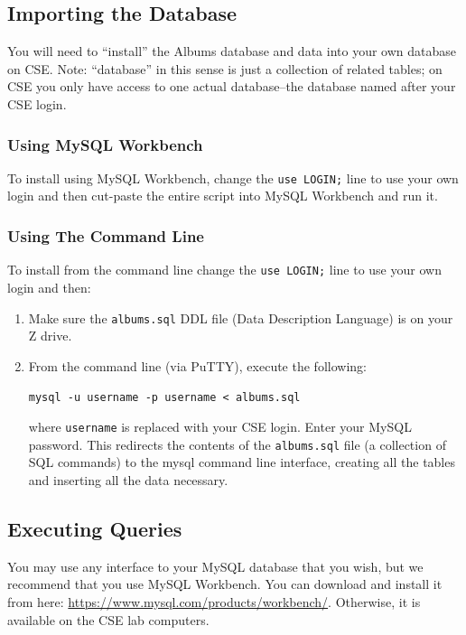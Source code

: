 \documentclass[12pt]{scrartcl}
\begin{document}
\subsection*{Importing the Database}

You will need to ``install'' the Albums database and data into your 
own database on CSE.  Note: ``database'' in this sense is just a collection 
of related tables; on CSE you only have access to one actual 
database--the database named after your CSE login.  

\subsubsection*{Using MySQL Workbench}

To install using MySQL Workbench, change the \texttt{use LOGIN;}
line to use your own login and then cut-paste the entire script into MySQL
Workbench and run it.  

\subsubsection*{Using The Command Line}

To install from the command line change the \texttt{use LOGIN;}
line to use your own login and then:

\begin{enumerate}
  \item Make sure the \texttt{albums.sql} DDL file (Data 
  	Description Language) is on your Z drive.  
  \item From the command line (via PuTTY), execute the following:
  
  \texttt{mysql -u username -p username < albums.sql}
  
  where \texttt{username} is replaced with your CSE login.
  Enter your MySQL password.  This redirects the contents of the 
  \texttt{albums.sql} file (a collection of SQL commands) 
  to the mysql command line interface, creating all the tables and 
  inserting all the data necessary.
\end{enumerate}
  
\subsection*{Executing Queries}

You may use any interface to your MySQL database that you wish, but 
we recommend that you use MySQL Workbench.  You can download and
install it from here: \url{https://www.mysql.com/products/workbench/}.
Otherwise, it is available on the CSE lab computers.
\end{document}
